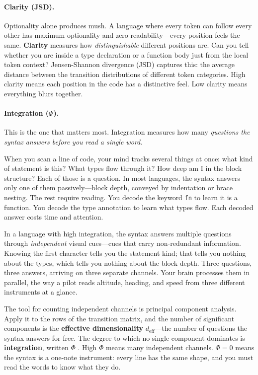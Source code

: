 \documentclass[11pt,a4paper]{article}
\newcommand{\deff}{d_{\mathrm{eff}}}
\begin{document}
\paragraph{Clarity (JSD).} Optionality alone produces mush. A language where every token can follow every other has maximum optionality and zero readability---every position feels the same. \textbf{Clarity} measures how \emph{distinguishable} different positions are. Can you tell whether you are inside a type declaration or a function body just from the local token context? Jensen-Shannon divergence (JSD) captures this: the average distance between the transition distributions of different token categories. High clarity means each position in the code has a distinctive feel. Low clarity means everything blurs together.

\paragraph{Integration ($\Phi$).} This is the one that matters most. Integration measures how many \emph{questions the syntax answers before you read a single word}.

When you scan a line of code, your mind tracks several things at once: what kind of statement is this? What types flow through it? How deep am I in the block structure? Each of those is a question. In most languages, the syntax answers only one of them passively---block depth, conveyed by indentation or brace nesting. The rest require reading. You decode the keyword \texttt{fn} to learn it is a function. You decode the type annotation to learn what types flow. Each decoded answer costs time and attention.

In a language with high integration, the syntax answers multiple questions through \emph{independent} visual cues---cues that carry non-redundant information. Knowing the first character tells you the statement kind; that tells you nothing about the types, which tells you nothing about the block depth. Three questions, three answers, arriving on three separate channels. Your brain processes them in parallel, the way a pilot reads altitude, heading, and speed from three different instruments at a glance.

The tool for counting independent channels is principal component analysis. Apply it to the rows of the transition matrix, and the number of significant components is the \textbf{effective dimensionality} $\deff$---the number of questions the syntax answers for free. The degree to which no single component dominates is \textbf{integration}, written $\Phi$ \cite{Tononi2004}. High $\Phi$ means many independent channels. $\Phi = 0$ means the syntax is a one-note instrument: every line has the same shape, and you must read the words to know what they do.
\end{document}
